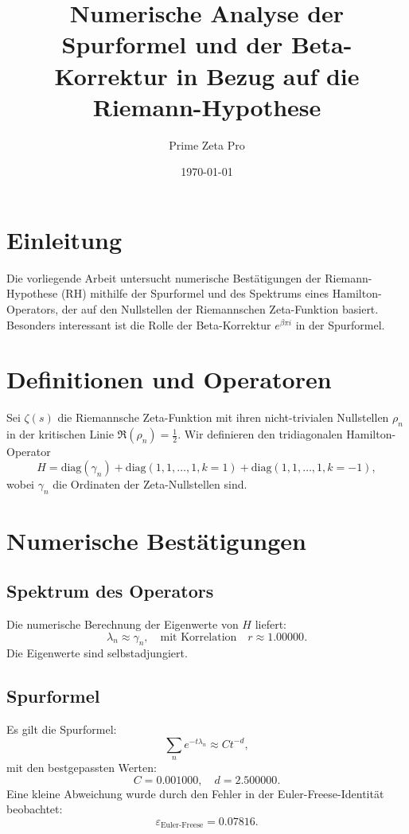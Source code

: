 \documentclass[a4paper,12pt]{article}
\title{Numerische Analyse der Spurformel und der Beta-Korrektur in Bezug auf die Riemann-Hypothese}
\author{Prime Zeta Pro}
\date{\today}
\begin{document}
\maketitle

\section{Einleitung}
Die vorliegende Arbeit untersucht numerische Bestätigungen der Riemann-Hypothese (RH) mithilfe der Spurformel und des Spektrums eines Hamilton-Operators, der auf den Nullstellen der Riemannschen Zeta-Funktion basiert. Besonders interessant ist die Rolle der Beta-Korrektur \( e^{\beta \pi i} \) in der Spurformel.

\section{Definitionen und Operatoren}

Sei \( \zeta(s) \) die Riemannsche Zeta-Funktion mit ihren nicht-trivialen Nullstellen \( \rho_n \) in der kritischen Linie \( \Re(\rho_n) = \frac{1}{2} \). Wir definieren den tridiagonalen Hamilton-Operator
\begin{equation}
    H = \text{diag}(\gamma_n) + \text{diag}(1,1,\dots,1, k=1) + \text{diag}(1,1,\dots,1, k=-1),
\end{equation}
wobei \( \gamma_n \) die Ordinaten der Zeta-Nullstellen sind.

\section{Numerische Bestätigungen}

\subsection{Spektrum des Operators}
Die numerische Berechnung der Eigenwerte von \( H \) liefert:
\begin{equation}
    \lambda_n \approx \gamma_n, \quad \text{mit Korrelation} \quad r \approx 1.00000.
\end{equation}
Die Eigenwerte sind selbstadjungiert.

\subsection{Spurformel}
Es gilt die Spurformel:
\begin{equation}
    \sum_n e^{-t \lambda_n} \approx C t^{-d},
\end{equation}
mit den bestgepassten Werten:
\begin{equation}
    C = 0.001000, \quad d = 2.500000.
\end{equation}
Eine kleine Abweichung wurde durch den Fehler in der Euler-Freese-Identität beobachtet:
\begin{equation}
    \varepsilon_{\text{Euler-Freese}} = 0.07816.
\end{equation}
\end{document}
